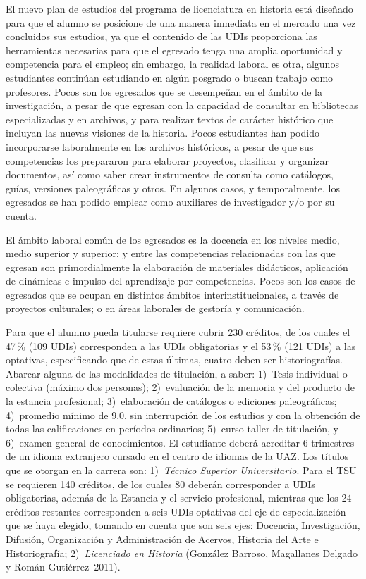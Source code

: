 El nuevo plan de estudios del programa de licenciatura en historia está 
diseñado para que el alumno se posicione de una manera inmediata en el 
mercado una vez concluidos sus estudios, ya que el contenido de las 
UDIs proporciona las herramientas necesarias para que el egresado tenga 
una amplia oportunidad y competencia para el empleo; sin embargo, la 
realidad laboral es otra, algunos estudiantes continúan estudiando en 
algún posgrado o buscan trabajo como profesores. Pocos son los 
egresados que se desempeñan en el ámbito de la investigación, a pesar 
de que egresan con la capacidad de consultar en bibliotecas 
especializadas y en archivos, y para realizar textos de carácter histórico que 
incluyan las nuevas visiones de la historia. Pocos estudiantes han 
podido incorporarse laboralmente en los  archivos históricos, a pesar de 
que sus competencias los prepararon para elaborar proyectos, clasificar 
y organizar documentos, así como saber crear instrumentos de consulta 
como catálogos, guías, versiones paleográficas y otros. En algunos 
casos, y temporalmente, los egresados se han podido emplear como 
auxiliares de investigador y\slash{}o por su cuenta.  

El ámbito laboral común de los egresados es la docencia en los 
niveles medio, medio superior y superior; y entre las competencias 
relacionadas con las que egresan son primordialmente la elaboración de materiales 
didácticos, aplicación de dinámicas e impulso del  aprendizaje por 
competencias. Pocos son los casos de egresados que se ocupan en 
distintos ámbitos interinstitucionales, a través de proyectos 
culturales; o en áreas laborales de gestoría y comunicación.  

\enlargethispage{1\baselineskip}
Para que el alumno pueda titularse requiere cubrir 230 créditos, de
los cuales el 47\,\% (109 UDIs) corresponden a las UDIs obligatorias y el 53\,\%
(121 UDIs) a las optativas, especificando que de estas últimas, cuatro
deben ser historiografías.  Abarcar alguna de las modalidades de titulación,
a saber: 1)~Tesis individual o colectiva (máximo dos personas); 2)~evaluación 
de la memoria y del producto de la estancia profesional; 3)~elaboración de 
catálogos o ediciones paleográficas; 4)~promedio mínimo de
9.0, sin interrupción de los estudios y con la obtención de todas las
calificaciones en períodos ordinarios; 5)~curso-taller de titulación, y 
6)~examen general de conocimientos.  El estudiante deberá acreditar 6
trimestres de un idioma extranjero cursado en el centro de idiomas de la
UAZ.  Los títulos que se otorgan en la carrera son: 1)~{\itshape Técnico Superior Universitario}. 
Para el TSU se requieren 140 créditos, de los cuales 80 deberán
corresponder a UDIs obligatorias, además de la Estancia y el servicio
profesional, mientras que los 24 créditos restantes corresponden a seis
UDIs optativas del eje  de especialización que se haya elegido, tomando en
cuenta que son seis ejes: Docencia, Investigación, Difusión, Organización y
Administración de Acervos, Historia del Arte e Historiografía; 2)~{\itshape Licenciado 
en Historia} (González Barroso, Magallanes Delgado y Román
Gutiérrez~2011).
 

